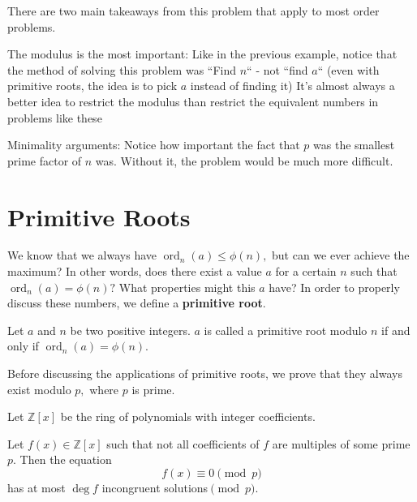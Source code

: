 \documentclass[blue,onecol]{shooting}
\begin{document}
There are two main takeaways from this problem that apply to most order problems.

\begin{itemize}
\Item The modulus is the most important: Like in the previous example, notice that the method of solving this problem was ``Find $n$`` - not ``find $a$`` (even with primitive roots, the idea is to pick $a$ instead of finding it) It's almost always a better idea to restrict the modulus than restrict the equivalent numbers in problems like these

\Item Minimality arguments: Notice how important the fact that $p$ was the smallest prime factor of $n$ was. Without it, the problem would be much more difficult.
\end{itemize}

\section{Primitive Roots}

We know that we always have $\operatorname{ord}_n(a) \le \phi(n),$ but can we ever achieve the maximum? In other words, does there exist a value $a$ for a certain $n$ such that $\operatorname{ord}_n(a) = \phi(n)?$ What properties might this $a$ have? In order to properly discuss these numbers, we define a \textbf{primitive root}. 

\begin{defi}
Let $a$ and $n$ be two positive integers. $a$ is called a primitive root modulo $n$ if and only if $\operatorname{ord}_n(a) = \phi(n).$
\end{defi}

Before discussing the applications of primitive roots, we prove that they always exist modulo $p,$ where $p$ is prime.

\begin{defi}
Let $\mathbb{Z}[x]$ be the ring of polynomials with integer coefficients.
\end{defi}

\begin{theo}[Lagrange]
Let $f(x) \in \mathbb{Z}[x]$ such that not all coefficients of $f$ are multiples of some prime $p.$ Then the equation $$f(x) \equiv 0 \pmod{p}$$ has at most $\operatorname{deg} f$ incongruent solutions$\pmod{p}.$
\end{theo}
\end{document}
